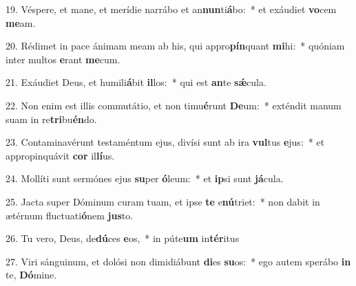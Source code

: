 19. Véspere, et mane, et merídie narrábo et an\textbf{nun}ti\textbf{á}bo:~*  et exáudiet \textbf{vo}cem \textbf{me}am.\

20. Rédimet in pace ánimam meam ab his, qui appro\textbf{pín}quant \textbf{mi}hi:~*  quóniam inter multos \textbf{e}rant \textbf{me}cum.\

21. Exáudiet Deus, et humili\textbf{á}bit \textbf{il}los:~*  qui est \textbf{an}te \textbf{sǽ}cula.\

22. Non enim est illis commutátio, et non timu\textbf{é}runt \textbf{De}um:~*  exténdit manum suam in re\textbf{tri}bu\textbf{én}do.\

23. Contaminavérunt testaméntum ejus, divísi sunt ab ira \textbf{vul}tus \textbf{e}jus:~*  et appropinquávit \textbf{cor} il\textbf{lí}us.\

24. Mollíti sunt sermónes ejus \textbf{su}per \textbf{ó}leum:~*  et \textbf{ip}si sunt \textbf{já}cula.\

25. Jacta super Dóminum curam tuam, et ipse \textbf{te} e\textbf{nú}triet:~*  non dabit in ætérnum fluctuati\textbf{ó}nem \textbf{jus}to.\

26. Tu vero, Deus, de\textbf{dú}ces \textbf{e}os,~*  in púte\textbf{um} in\textbf{tér}itus\

27. Viri sánguinum, et dolósi non dimidiábunt \textbf{di}es \textbf{su}os:~*  ego autem sperábo \textbf{in} te, \textbf{Dó}mine.\

